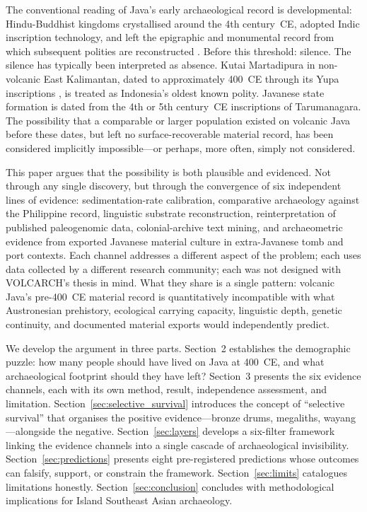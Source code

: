 \documentclass[12pt,a4paper]{article}
\begin{document}
The conventional reading of Java's early archaeological record is developmental: Hindu-Buddhist kingdoms crystallised around the 4th century~CE, adopted Indic inscription technology, and left the epigraphic and monumental record from which subsequent polities are reconstructed \citep{coedes1968,miksic2004}. Before this threshold: silence. The silence has typically been interpreted as absence. Kutai Martadipura in non-volcanic East Kalimantan, dated to approximately 400~CE through its Yupa inscriptions \citep{vogel1918}, is treated as Indonesia's oldest known polity. Javanese state formation is dated from the 4th or 5th century~CE inscriptions of Tarumanagara. The possibility that a comparable or larger population existed on volcanic Java before these dates, but left no surface-recoverable material record, has been considered implicitly impossible---or perhaps, more often, simply not considered.

This paper argues that the possibility is both plausible and evidenced. Not through any single discovery, but through the convergence of six independent lines of evidence: sedimentation-rate calibration, comparative archaeology against the Philippine record, linguistic substrate reconstruction, reinterpretation of published paleogenomic data, colonial-archive text mining, and archaeometric evidence from exported Javanese material culture in extra-Javanese tomb and port contexts. Each channel addresses a different aspect of the problem; each uses data collected by a different research community; each was not designed with VOLCARCH's thesis in mind. What they share is a single pattern: volcanic Java's pre-400~CE material record is quantitatively incompatible with what Austronesian prehistory, ecological carrying capacity, linguistic depth, genetic continuity, and documented material exports would independently predict.

We develop the argument in three parts. Section~2 establishes the demographic puzzle: how many people should have lived on Java at 400~CE, and what archaeological footprint should they have left? Section~3 presents the six evidence channels, each with its own method, result, independence assessment, and limitation. Section~\ref{sec:selective_survival} introduces the concept of ``selective survival'' that organises the positive evidence---bronze drums, megaliths, wayang---alongside the negative. Section~\ref{sec:layers} develops a six-filter framework linking the evidence channels into a single cascade of archaeological invisibility. Section~\ref{sec:predictions} presents eight pre-registered predictions whose outcomes can falsify, support, or constrain the framework. Section~\ref{sec:limits} catalogues limitations honestly. Section~\ref{sec:conclusion} concludes with methodological implications for Island Southeast Asian archaeology.
\end{document}
